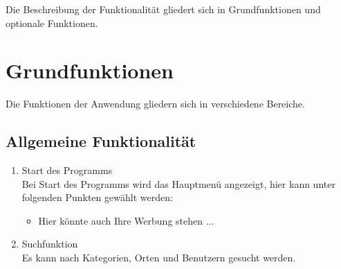 
Die Beschreibung der Funktionalität gliedert sich in Grundfunktionen und optionale Funktionen.

\section{Grundfunktionen}

Die Funktionen der Anwendung gliedern sich in verschiedene Bereiche.

\subsection{Allgemeine Funktionalität}
\begin{enumerate}[align=left, label={\textbf{\textbackslash F00\arabic*0\textbackslash}} ]
	\item Start des Programms \\
	Bei Start des Programms wird das Hauptmenü angezeigt, hier kann unter folgenden Punkten gewählt werden:
	\begin{itemize}
		\item Hier könnte auch Ihre Werbung stehen ...
	\end{itemize}
	\item Suchfunktion \label{:PF_Suchfunktion} \\
	Es kann nach Kategorien, Orten und Benutzern gesucht werden. 

\end{enumerate}
